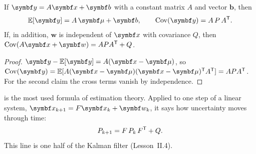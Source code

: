 \begin{theorem}
\label{thm:E-APA}
If $\symbf y = A\vx + \symbf b$ with a constant matrix $A$ and vector $\symbf b$, then
\begin{equation}\label{eq:E-APA}
  \mathbb{E}[\symbf y] = A\,\symbf\mu + \symbf b, \qquad \operatorname{Cov}(\symbf y) = A\,P\,A^\T .
\end{equation}
If, in addition, $\symbf w$ is independent of $\vx$ with covariance $Q$, then $\operatorname{Cov}(A\vx + \symbf w) = APA^\T + Q$.
\end{theorem}
\begin{proof}
$\symbf y - \mathbb{E}[\symbf y] = A(\vx - \symbf\mu)$, so $\operatorname{Cov}(\symbf y) = \mathbb{E}[A(\vx - \symbf\mu)(\vx - \symbf\mu)^\T A^\T] = APA^\T$. For the second claim the cross terms vanish by independence.
\end{proof}

 is the most used formula of estimation theory. Applied to one step of a linear system, $\vx_{k+1} = F\vx_k + \symbf w_k$, it says how uncertainty moves through time:
\begin{equation}\label{eq:E-prop}
  P_{k+1} = F\,P_k\,F^{\mathsf{T}} + Q .
\end{equation}
This line is one half of the Kalman filter (Lesson~II.4).

